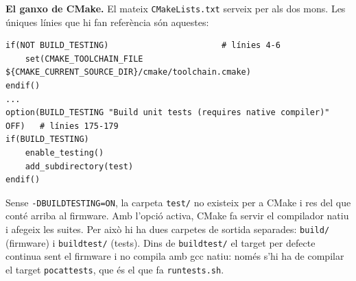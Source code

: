 \documentclass[11pt,a4paper]{article}
\DeclareRobustCommand{\_}{\textunderscore\allowbreak}
\newcommand{\cd}[1]{\texttt{#1}}
\begin{document}
\textbf{El ganxo de CMake.} El mateix \cd{CMakeLists.txt} serveix per als dos mons. Les
úniques línies que hi fan referència són aquestes:
\begin{lstlisting}
if(NOT BUILD_TESTING)                       # línies 4-6
    set(CMAKE_TOOLCHAIN_FILE ${CMAKE_CURRENT_SOURCE_DIR}/cmake/toolchain.cmake)
endif()
...
option(BUILD_TESTING "Build unit tests (requires native compiler)" OFF)   # línies 175-179
if(BUILD_TESTING)
    enable_testing()
    add_subdirectory(test)
endif()
\end{lstlisting}
Sense \cd{-DBUILD\_TESTING=ON}, la carpeta \cd{test/} no existeix per a CMake i res del
que conté arriba al firmware. Amb l'opció activa, CMake fa servir el compilador natiu i
afegeix les suites. Per això hi ha dues carpetes de sortida separades: \cd{build/}
(firmware) i \cd{build\_test/} (tests). Dins de \cd{build\_test/} el target per defecte
continua sent el firmware i no compila amb gcc natiu: només s'hi ha de compilar el target
\cd{pocat\_tests}, que és el que fa \cd{run\_tests.sh}.
\end{document}
